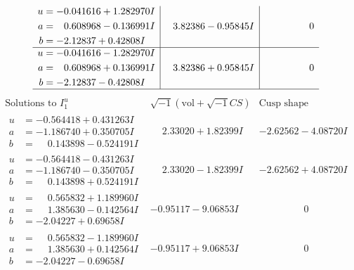 \documentclass[1p]{elsarticle_modified}
\theoremstyle{definition}
\newcommand{\I}{\sqrt{-1}}
\begin{document}
$$\begin{array}{c|c|c}
\begin{aligned}
u &= -0.041616 + 1.282970 I \\
a &= \phantom{-}0.608968 - 0.136991 I \\
b &= -2.12837 + 0.42808 I\end{aligned}
 & \phantom{-}3.82386 - 0.95845 I & \phantom{-0.000000 } 0 \\ \hline\begin{aligned}
u &= -0.041616 - 1.282970 I \\
a &= \phantom{-}0.608968 + 0.136991 I \\
b &= -2.12837 - 0.42808 I\end{aligned}
 & \phantom{-}3.82386 + 0.95845 I & \phantom{-0.000000 } 0\\
 \hline 
 \end{array}$$\newpage$$\begin{array}{c|c|c}  
\text{Solutions to }I^u_{1}& \I (\text{vol} + \sqrt{-1}CS) & \text{Cusp shape}\\
 \hline 
\begin{aligned}
u &= -0.564418 + 0.431263 I \\
a &= -1.186740 + 0.350705 I \\
b &= \phantom{-}0.143898 - 0.524191 I\end{aligned}
 & \phantom{-}2.33020 + 1.82399 I & -2.62562 - 4.08720 I \\ \hline\begin{aligned}
u &= -0.564418 - 0.431263 I \\
a &= -1.186740 - 0.350705 I \\
b &= \phantom{-}0.143898 + 0.524191 I\end{aligned}
 & \phantom{-}2.33020 - 1.82399 I & -2.62562 + 4.08720 I \\ \hline\begin{aligned}
u &= \phantom{-}0.565832 + 1.189960 I \\
a &= \phantom{-}1.385630 - 0.142564 I \\
b &= -2.04227 + 0.69658 I\end{aligned}
 & -0.95117 - 9.06853 I & \phantom{-0.000000 } 0 \\ \hline\begin{aligned}
u &= \phantom{-}0.565832 - 1.189960 I \\
a &= \phantom{-}1.385630 + 0.142564 I \\
b &= -2.04227 - 0.69658 I\end{aligned}
 & -0.95117 + 9.06853 I & \phantom{-0.000000 } 0 \\ \hline\begin{aligned}

\end{aligned}
\end{array}$$
\end{document}
